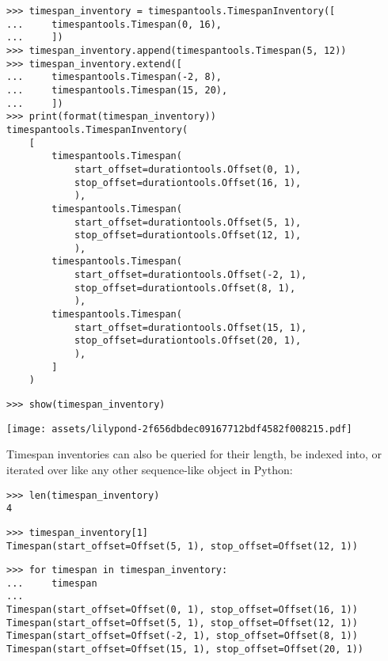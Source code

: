 \begin{abjadbookoutput}
\begin{singlespacing}
\vspace{-0.5\baselineskip}
\begin{verbatim}
>>> timespan_inventory = timespantools.TimespanInventory([
...     timespantools.Timespan(0, 16),
...     ])
>>> timespan_inventory.append(timespantools.Timespan(5, 12))
>>> timespan_inventory.extend([
...     timespantools.Timespan(-2, 8),
...     timespantools.Timespan(15, 20),
...     ])
>>> print(format(timespan_inventory))
timespantools.TimespanInventory(
    [
        timespantools.Timespan(
            start_offset=durationtools.Offset(0, 1),
            stop_offset=durationtools.Offset(16, 1),
            ),
        timespantools.Timespan(
            start_offset=durationtools.Offset(5, 1),
            stop_offset=durationtools.Offset(12, 1),
            ),
        timespantools.Timespan(
            start_offset=durationtools.Offset(-2, 1),
            stop_offset=durationtools.Offset(8, 1),
            ),
        timespantools.Timespan(
            start_offset=durationtools.Offset(15, 1),
            stop_offset=durationtools.Offset(20, 1),
            ),
        ]
    )
\end{verbatim}
\begin{verbatim}
>>> show(timespan_inventory)
\end{verbatim}
\noindent\texttt{[image: assets/lilypond-2f656dbdec09167712bdf4582f008215.pdf]}
\end{singlespacing}
\end{abjadbookoutput}

\noindent Timespan inventories can also be queried for their length, be indexed
into, or iterated over like any other sequence-like object in Python:

\begin{comment}
<abjad>
len(timespan_inventory)
timespan_inventory[1]
for timespan in timespan_inventory:
    timespan

</abjad>
\end{comment}

\begin{abjadbookoutput}
\begin{singlespacing}
\vspace{-0.5\baselineskip}
\begin{verbatim}
>>> len(timespan_inventory)
4
\end{verbatim}
\begin{verbatim}
>>> timespan_inventory[1]
Timespan(start_offset=Offset(5, 1), stop_offset=Offset(12, 1))
\end{verbatim}
\begin{verbatim}
>>> for timespan in timespan_inventory:
...     timespan
...
Timespan(start_offset=Offset(0, 1), stop_offset=Offset(16, 1))
Timespan(start_offset=Offset(5, 1), stop_offset=Offset(12, 1))
Timespan(start_offset=Offset(-2, 1), stop_offset=Offset(8, 1))
Timespan(start_offset=Offset(15, 1), stop_offset=Offset(20, 1))
\end{verbatim}
\end{singlespacing}
\end{abjadbookoutput}

